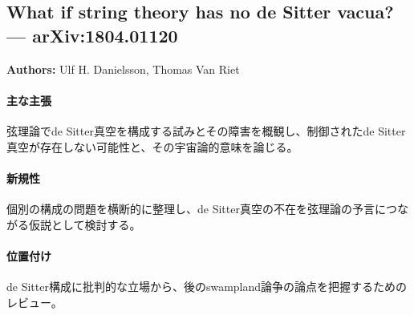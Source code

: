 \subsection{What if string theory has no de Sitter vacua? --- arXiv:1804.01120}

\textbf{Authors:} Ulf H. Danielsson, Thomas Van Riet

\paragraph{主な主張}
弦理論でde Sitter真空を構成する試みとその障害を概観し、制御されたde Sitter真空が存在しない可能性と、その宇宙論的意味を論じる\cite{Danielsson:2018ztv}。

\paragraph{新規性}
個別の構成の問題を横断的に整理し、de Sitter真空の不在を弦理論の予言につながる仮説として検討する。

\paragraph{位置付け}
de Sitter構成に批判的な立場から、後のswampland論争の論点を把握するためのレビュー。
